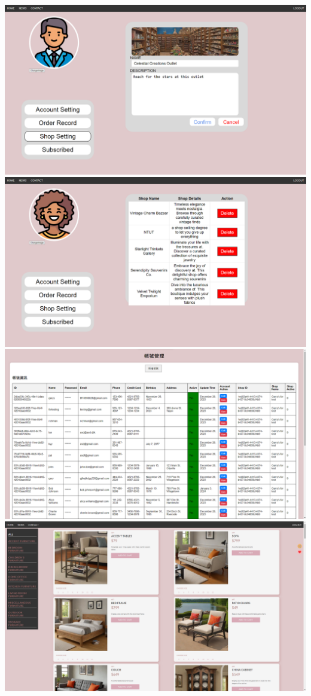 \documentclass[a4paper, 12pt]{article}
\begin{document}
\begin{center}
\includegraphics[scale=0.3]{ui/accountSettingShop.png}
\includegraphics[scale=0.3]{ui/accountSettingSubscribtion.png}
\includegraphics[scale=0.3]{ui/adminPage.png}
\includegraphics[scale=0.3]{ui/mainPage.png}

\end{center}
\end{document}
